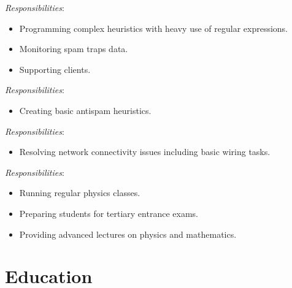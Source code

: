 \documentclass[11pt,a4paper,sans]{moderncv}        %
\newcommand{\responsibilities}[1]{ \emph{Responsibilities}:\begin{itemize} #1\end{itemize}}
\begin{document}
 {
    \responsibilities {
        \item Programming complex heuristics with heavy use of regular expressions.
        \item Monitoring spam traps data.
        \item Supporting clients.
    }
}

 {
    \responsibilities {
        \item Creating basic antispam heuristics.
    }
}

 {
    \responsibilities {
        \item Resolving network connectivity issues including basic wiring tasks.
    }
}

 {
    \responsibilities {
        \item Running regular physics classes.
        \item Preparing students for tertiary entrance exams.
        \item Providing advanced lectures on physics and mathematics.
    }
}


\section{Education}
\end{document}
